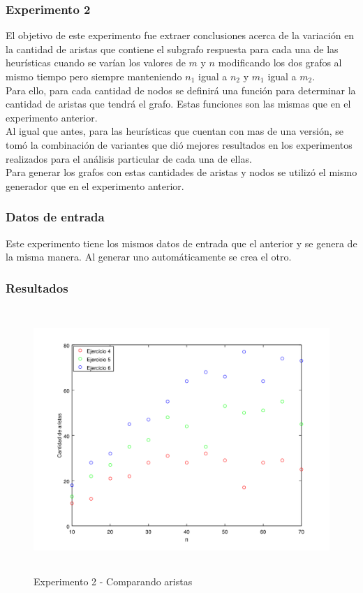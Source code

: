 \subsubsection*{Experimento 2}\;
 El objetivo de este experimento fue extraer conclusiones acerca de la variación en la cantidad de aristas que contiene el subgrafo respuesta para cada una de las heurísticas cuando se varían los valores de $m$ y $n$ modificando los dos grafos al mismo tiempo pero siempre manteniendo $n_1$ igual a $n_2$ y $m_1$ igual a $m_2$. \\
Para ello, para cada cantidad de nodos se definirá una función para determinar la cantidad de aristas que tendrá el grafo. Estas funciones son las mismas que en el experimento anterior.\\
Al igual que antes, para las heurísticas que cuentan con mas de una versión, se tomó la combinación de variantes que dió mejores resultados en los experimentos realizados para el análisis particular de cada una de ellas.\\
Para generar los grafos con estas cantidades de aristas y nodos se utilizó el mismo generador que en el experimento anterior.\\

\subsubsection*{Datos de entrada}\;

Este experimento tiene los mismos datos de entrada que el anterior y se genera de la misma manera. Al generar uno automáticamente se crea el otro.

\subsubsection*{Resultados}\;
  \begin{figure}[H]
      \includegraphics[height=10cm]{graficos/ejercicio7-exp2-aristas.png}
       \caption{Experimento 2 - Comparando aristas}
	\end{figure}
    
